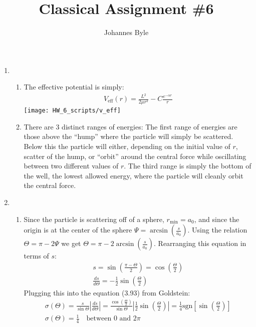 \documentclass[12pt]{article}
\title{Classical Assignment \#6}
\author{Johannes Byle}
\newcommand{\der}[2]{\frac{d #1}{d #2}}
\begin{document}
  \maketitle
  \begin{enumerate}
    \item
    \begin{enumerate}
      \item The effective potential is simply:
      \begin{gather*}
        V_{\text{eff}}(r)=\frac{L^2}{2\mu r^2}-C\frac{e^{-\alpha r}}{r}
      \end{gather*}
      \texttt{[image: HW\_6\_scripts/v\_eff]}
      \item
      There are 3 distinct ranges of energies:
      The first range of energies are those above the \enquote{hump} where the particle will simply be scattered.
      Below this the particle will either, depending on the initial value of $r$, scatter of the hump, or \enquote{orbit} around the central force while oscillating between two different values of $r$.
      The third range is simply the bottom of the well, the lowest allowed energy, where the particle will cleanly orbit the central force.
    \end{enumerate}
    \item
    \begin{enumerate}
      \item Since the particle is scattering off of a sphere, $r_{\min}=a_0$, and since the origin is at the center of the sphere $\Psi=\arcsin\left( \frac{s}{a_0} \right)$.
      Using the relation $\Theta=\pi-2\Psi$ we get $\Theta=\pi-2\arcsin\left( \frac{s}{a_0} \right)$.
      Rearranging this equation in terms of $s$:
      \begin{gather*}
        s=\sin\left(\frac{\pi-\Theta}{2}\right)=\cos\left( \frac{\Theta}{2} \right)\\
        \der{s}{\Theta}=-\frac{1}{2}\sin\left( \frac{\Theta}{2} \right)
      \end{gather*}
      Plugging this into the equation (3.93) from Goldstein:
      \begin{gather*}
        \sigma(\Theta)=\frac{s}{\sin\Theta}\left| \frac{ds}{d\Theta} \right|=\frac{\cos\left( \frac{\Theta}{2} \right)}{\sin\Theta}\left| \frac{1}{2}\sin\left( \frac{\Theta}{2} \right) \right|=\frac{1}{4}\text{sgn}\left[\sin\left( \frac{\Theta}{2} \right)\right]\\
        \sigma(\Theta)=\frac{1}{4}\quad\text{between 0 and 2}\pi
      \end{gather*}

\end{enumerate}
\end{enumerate}
\end{document}
